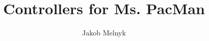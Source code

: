\documentclass[conference]{IEEEtran}
\begin{document}
\title{\ \\ \LARGE\bf Controllers for Ms. PacMan}

\author{Jakob Melnyk}

\maketitle













\end{document}
